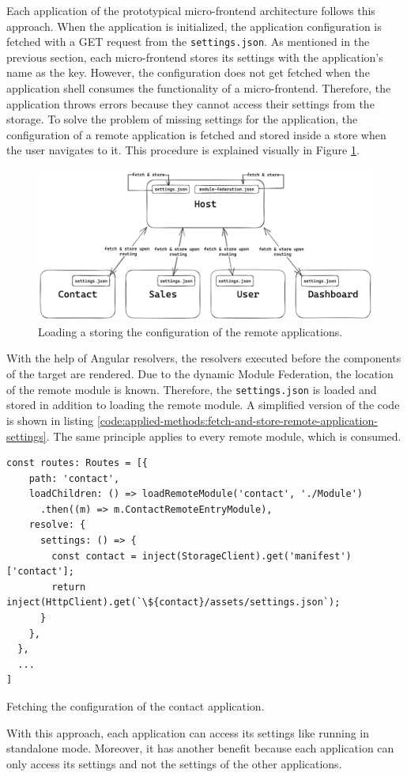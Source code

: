 Each application of the prototypical micro-frontend architecture follows this approach. When the application is initialized, the application configuration is fetched with a GET request from the \texttt{settings.json}. As mentioned in the previous section, each micro-frontend stores its settings with the application's name as the key. However, the configuration does not get fetched when the application shell consumes the functionality of a micro-frontend. Therefore, the application throws errors because they cannot access their settings from the storage. To solve the problem of missing settings for the application, the configuration of a remote application is fetched and stored inside a store when the user navigates to it. This procedure is explained visually in Figure \ref{fig:applied-methods:load-remote-settings}.

\ifshowImages
  \begin{figure}[H]
  \centering
  \includegraphics[width=0.9\linewidth]{images/applied-methods/prototypical-implementation/load-remote-settings.png}
  \caption{Loading a storing the configuration of the remote applications.}\label{fig:applied-methods:load-remote-settings}
  \end{figure}
\fi

\noindent With the help of Angular resolvers, the resolvers executed before the components of the target are rendered. Due to the dynamic Module Federation, the location of the remote module is known. Therefore, the \texttt{settings.json} is loaded and stored in addition to loading the remote module. A simplified version of the code is shown in listing \ref{code:applied-methods:fetch-and-store-remote-application-settings}. The same principle applies to every remote module, which is consumed.

\ifshowListings
\begin{listing}[H]
\begin{verbatim}
const routes: Routes = [{
    path: 'contact',
    loadChildren: () => loadRemoteModule('contact', './Module')
      .then((m) => m.ContactRemoteEntryModule),
    resolve: {
      settings: () => {
        const contact = inject(StorageClient).get('manifest')['contact'];
        return inject(HttpClient).get(`\${contact}/assets/settings.json`);
      }
    },
  },
  ...
]
\end{verbatim}
\caption{Fetching the configuration of the contact application.}\label{code:applied-methods:fetch-and-store-remote-application-settings}
\end{listing}
\fi

\noindent With this approach, each application can access its settings like running in standalone mode. Moreover, it has another benefit because each application can only access its settings and not the settings of the other applications. 
